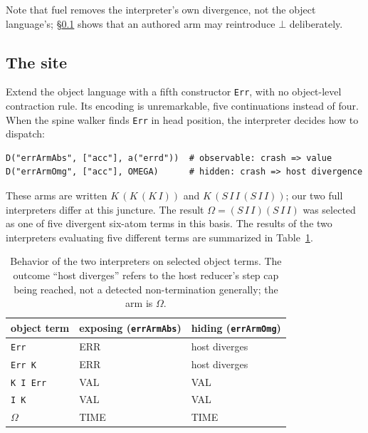 \documentclass[review]{jfp-epi}
\begin{document}
Note that fuel removes the interpreter's own divergence, not the object
language's; \S\ref{sec:site} shows that an authored arm may
reintroduce $\bot$ deliberately.

\subsection{The site}\label{sec:site}

Extend the object language with a fifth constructor \texttt{Err}, with
no object-level contraction rule. Its encoding is unremarkable, five
continuations instead of four. When the spine walker finds \texttt{Err}
in head position, the interpreter decides how to dispatch:
\begin{verbatim}
D("errArmAbs", ["acc"], a("errd"))  # observable: crash => value
D("errArmOmg", ["acc"], OMEGA)      # hidden: crash => host divergence
\end{verbatim}
These arms are written $K\,(K\,(K\,I))$ and $K\,(S\,I\,I\,(S\,I\,I))$;
our two full interpreters differ at this juncture. The result $\Omega =
(S\,I\,I)(S\,I\,I)$ was selected as one of five divergent six-atom terms
in this basis.  The results of the two interpreters evaluating five
different terms are summarized in Table~\ref{tab:behavior}.


\begin{table}[tb]
\centering
\caption{Behavior of the two interpreters on selected object terms.
The outcome ``host diverges'' refers to the host reducer's step cap
being reached, not a detected non-termination generally; the arm is
$\Omega$.}
\label{tab:behavior}
\begin{tabular}{lll}
\toprule
object term & exposing (\texttt{errArmAbs}) & hiding (\texttt{errArmOmg}) \\
\midrule
\texttt{Err}     & ERR  & host diverges \\
\texttt{Err K}   & ERR  & host diverges \\
\texttt{K I Err} & VAL  & VAL \\
\texttt{I K}     & VAL  & VAL \\
$\Omega$         & TIME & TIME \\
\bottomrule
\end{tabular}
\end{table}
\end{document}
